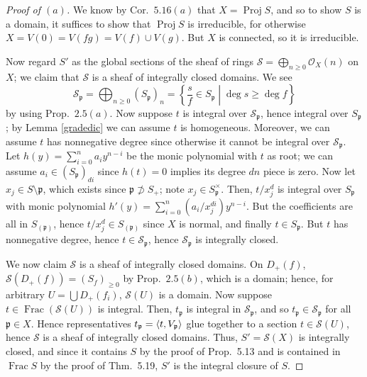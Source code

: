 \documentclass[12pt,letterpaper]{article}
\theoremstyle{definition}
\theoremstyle{remark}
\numberwithin{equation}{section}
\numberwithin{figure}{problem}
\DeclareMathOperator{\Frac}{Frac}
\DeclareMathOperator{\Proj}{Proj}
\newcommand{\OO}{\mathcal{O}}
\begin{document}
\begin{proof}[Proof of $(a)$]
  We know by Cor.~$5.16(a)$ that $X = \Proj S$, and so to show $S$ is a domain, it suffices to show that $\Proj S$ is irreducible, for otherwise $X = V(0) = V(fg) = V(f) \cup V(g)$. But $X$ is connected, so it is irreducible.
  \par Now regard $S'$ as the global sections of the sheaf of rings $\mathscr{S} = \bigoplus_{n \ge 0} \OO_X(n)$ on $X$; we claim that $\mathscr{S}$ is a sheaf of integrally closed domains. We see
  \begin{equation*}
    \mathscr{S}_{\mathfrak{p}} = \bigoplus_{n \ge 0} (S_{\mathfrak{p}})_n = \left\{ \frac{s}{f} \in S_{\mathfrak{p}} \middle\vert \deg s \ge \deg f \right\}
  \end{equation*}
  by using Prop.~$2.5(a)$. Now suppose $t$ is integral over $\mathscr{S}_{\mathfrak{p}}$, hence integral over $S_{\mathfrak{p}}$; by Lemma \ref{gradedic} we can assume $t$ is homogeneous. Moreover, we can assume $t$ has nonnegative degree since otherwise it cannot be integral over $\mathscr{S}_{\mathfrak{p}}$. Let $h(y) = \sum_{i=0}^n a_iy^{n-i}$ be the monic polynomial with $t$ as root; we can assume $a_i \in (S_\mathfrak{p})_{di}$ since $h(t) = 0$ implies its degree $dn$ piece is zero. Now let $x_j \in S \setminus \mathfrak{p}$, which exists since $\mathfrak{p} \not\supset S_+$; note $x_j \in S_{\mathfrak{p}}^\times$. Then, $t/x_j^d$ is integral over $S_{\mathfrak{p}}$ with monic polynomial $h'(y) = \sum_{i=0}^n (a_i/x_j^{di}) y^{n-i}$. But the coefficients are all in $S_{(\mathfrak{p})}$, hence $t/x_j^d \in S_{(\mathfrak{p})}$ since $X$ is normal, and finally $t \in S_{\mathfrak{p}}$. But $t$ has nonnegative degree, hence $t \in \mathscr{S}_{\mathfrak{p}}$, hence $\mathscr{S}_{\mathfrak{p}}$ is integrally closed.
  \par We now claim $\mathscr{S}$ is a sheaf of integrally closed domains. On $D_+(f)$, $\mathscr{S}(D_+(f)) = (S_f)_{\ge0}$ by Prop.~$2.5(b)$, which is a domain; hence, for arbitrary $U = \bigcup D_+(f_i)$, $\mathscr{S}(U)$ is a domain. Now suppose $t \in \Frac(\mathscr{S}(U))$ is integral. Then, $t_\mathfrak{p}$ is integral in $\mathscr{S}_\mathfrak{p}$, and so $t_\mathfrak{p} \in \mathscr{S}_{\mathfrak{p}}$ for all $\mathfrak{p} \in X$. Hence representatives $t_\mathfrak{p} = \braket{t,V_\mathfrak{p}}$ glue together to a section $t \in \mathscr{S}(U)$, hence $\mathscr{S}$ is a sheaf of integrally closed domains. Thus, $S' = \mathscr{S}(X)$ is integrally closed, and since it contains $S$ by the proof of Prop.~5.13 and is contained in $\Frac S$ by the proof of Thm.~5.19, $S'$ is the integral closure of $S$.
\end{proof}
\end{document}
